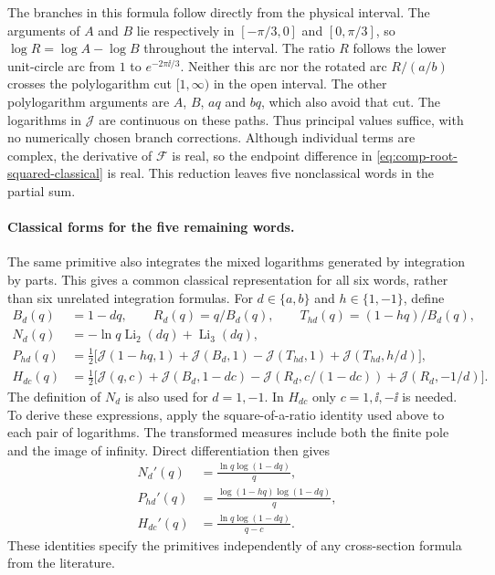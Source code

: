The branches in this formula follow directly from the physical
interval. The arguments of $A$ and $B$ lie respectively in
$[-\pi/3,0]$ and $[0,\pi/3]$, so
$\log R=\log A-\log B$ throughout the interval.
The ratio $R$ follows the lower unit-circle arc from $1$ to
$e^{-2\pi\ii/3}$. Neither this arc nor the rotated arc $R/(a/b)$
crosses the polylogarithm cut $[1,\infty)$ in the open interval.
The other polylogarithm arguments are $A$, $B$, $aq$ and $bq$,
which also avoid that cut. The logarithms in $\mathcal J$ are
continuous on these paths. Thus principal values suffice, with no
numerically chosen branch corrections. Although individual terms
are complex, the derivative of $\mathcal F$ is real, so the endpoint
difference in \eqref{eq:comp-root-squared-classical} is real.
This reduction leaves five nonclassical words in the partial sum.

\paragraph{Classical forms for the five remaining words.}
The same primitive also integrates the mixed logarithms generated by
integration by parts. This gives a common classical representation for
all six words, rather than six unrelated integration formulas.
For $d\in\{a,b\}$ and $h\in\{1,-1\}$, define
\begin{align}
 B_d(q)&=1-dq,\qquad R_d(q)=q/B_d(q),\qquad
 T_{hd}(q)=(1-hq)/B_d(q),\\
 N_d(q)&=-\ln q\operatorname{Li}_2(dq)+\operatorname{Li}_3(dq),\\
 P_{hd}(q)&=\tfrac12\bigl[\mathcal J(1-hq,1)+\mathcal J(B_d,1)
             -\mathcal J(T_{hd},1)+\mathcal J(T_{hd},h/d)\bigr],\\
 H_{dc}(q)&=\tfrac12\bigl[\mathcal J(q,c)+\mathcal J(B_d,1-dc)
             -\mathcal J(R_d,c/(1-dc))+\mathcal J(R_d,-1/d)\bigr].
 \label{eq:comp-root-mixed-functions}
\end{align}
The definition of $N_d$ is also used for $d=1,-1$.
In $H_{dc}$ only $c=1,\ii,-\ii$ is needed.
To derive these expressions, apply the square-of-a-ratio identity
used above to each pair of logarithms. The transformed measures
include both the finite pole and the image of infinity. Direct
differentiation then gives
\begin{align}
 N_d'(q)&=\frac{\ln q\log(1-dq)}q,\\
 P_{hd}'(q)&=\frac{\log(1-hq)\log(1-dq)}q,\\
 H_{dc}'(q)&=\frac{\ln q\log(1-dq)}{q-c}.
 \label{eq:comp-root-mixed-derivatives}
\end{align}
These identities specify the primitives independently of any cross-section
formula from the literature.

